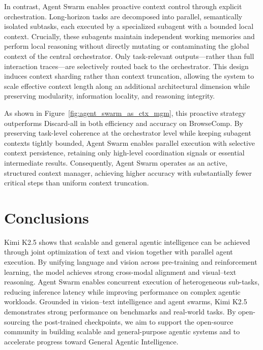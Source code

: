 \documentclass{article}
\begin{document}
In contrast, Agent Swarm enables proactive context control through explicit orchestration. Long-horizon tasks are decomposed into parallel, semantically isolated subtasks, each executed by a specialized subagent with a bounded local context. Crucially, these subagents maintain independent working memories and perform local reasoning without directly mutating or contaminating the global context of the central orchestrator. Only task-relevant outputs—rather than full interaction traces—are selectively routed back to the orchestrator. This design induces context sharding rather than context truncation, allowing the system to scale effective context length along an additional architectural dimension while preserving modularity, information locality, and reasoning integrity.

As shown in Figure~\ref{fig:agent_swarm_as_ctx_mgm}, this proactive strategy outperforms Discard-all in both efficiency and accuracy on BrowseComp. By preserving task-level coherence at the orchestrator level while keeping subagent contexts tightly bounded, Agent Swarm enables parallel execution with selective context persistence, retaining only high-level coordination signals or essential intermediate results. Consequently, Agent Swarm operates as an active, structured context manager, achieving higher accuracy with substantially fewer critical steps than uniform context truncation.

\section{Conclusions}
Kimi K2.5 shows that scalable and general agentic intelligence can be achieved through joint optimization of text and vision together with parallel agent execution. By unifying language and vision across pre-training and reinforcement learning, the model achieves strong cross-modal alignment and visual–text reasoning. Agent Swarm enables concurrent execution of heterogeneous sub-tasks, reducing inference latency while improving performance on complex agentic workloads. Grounded in vision–text intelligence and agent swarms, Kimi K2.5 demonstrates strong performance on benchmarks and real-world tasks. By open-sourcing the post-trained checkpoints, we aim to support the open-source community in building scalable and general-purpose agentic systems and to accelerate progress toward General Agentic Intelligence.

\newpage
\printbibliography[title={References}]

\newpage
\appendix
\end{document}
